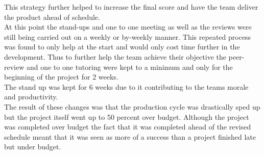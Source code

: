 \documentclass{article}
\begin{document}
This strategy further helped to increase the final score and have the team deliver the product ahead of schedule. \\
At this point the stand-ups and one to one meeting as well as the reviews were still being carried out on a weekly or by-weekly manner. This repeated process was found to only help at the start and would only cost time further in the development. Thus to further help the team achieve their objective the peer-review and one to one tutoring were kept to a minimum and only for the beginning of the project for 2 weeks.\\
The stand up was kept for 6 weeks due to it contributing to the teams morale and productivity.\\
The result of these changes was that the production cycle was drastically sped up but the project itself went up to 50 percent over budget. Although the project was completed over budget the fact that it was completed ahead of the revised schedule meant that it was seen as more of a success than a project finished late but under budget.





\pagebreak
\end{document}
